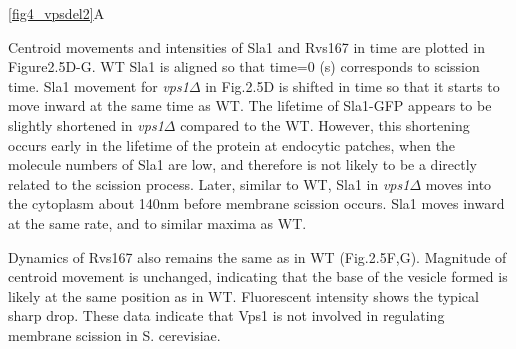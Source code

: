\vspace{2mm}
\ref{fig4_vpsdel2}A 

Centroid movements and intensities of Sla1 and Rvs167 in time are plotted in Figure2.5D-G. WT Sla1 is aligned so that time=0 (s) corresponds to scission time. Sla1 movement for \textit{vps1$\Delta$}   in Fig.2.5D is shifted in time so that it starts to move inward at the same time as WT. The lifetime of Sla1-GFP appears to be slightly shortened in \textit{vps1$\Delta$}   compared to the WT. However, this shortening occurs early in the lifetime of the protein at endocytic patches, when the molecule numbers of Sla1 are low, and therefore is not likely to be a directly related to the scission process. Later, similar to WT, Sla1 in \textit{vps1$\Delta$}  moves into the cytoplasm about 140nm before membrane scission occurs. Sla1 moves inward at the same rate, and to similar maxima as WT. 


\vspace{5mm}
Dynamics of Rvs167 also remains the same as in WT (Fig.2.5F,G). Magnitude of centroid movement is unchanged, indicating that the base of the vesicle formed is likely at the same position as in WT. Fluorescent intensity shows the typical sharp drop. These data indicate that Vps1 is not involved in regulating membrane scission in S. cerevisiae.  

\vspace{5mm}

